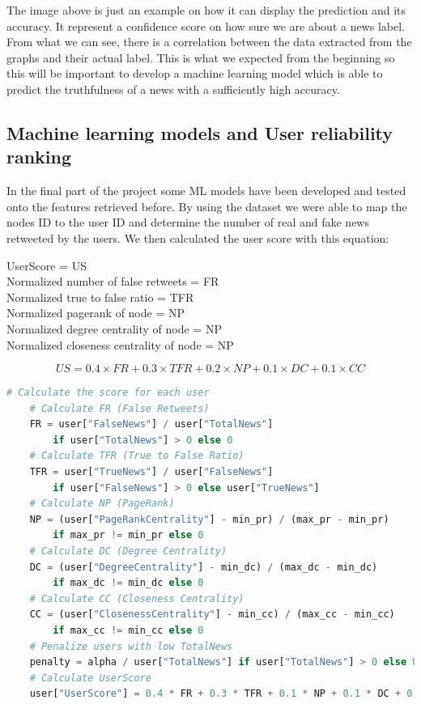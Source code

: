 \documentclass[11pt,a4paper]{article}
\begin{document}
The image above is just an example on how it can display the prediction and its accuracy. It represent
a conﬁdence score on how sure we are about a news label. From what we can see, there is a correlation between the data extracted from
the graphs and their actual label. This is what we expected from the beginning so this will be important to develop a machine learning model which is able to predict the truthfulness of a news with a sufficiently high accuracy.

\newpage

\subsection*{Machine learning models and User reliability ranking}

In the final part of the project some ML models have been developed and tested onto the features retrieved before. By using the dataset we were able to map the nodes ID to the user ID and determine the number of real and fake news retweeted by the users. We then calculated the user score with this equation:

\begin{center}
	UserScore = US \\
	Normalized number of false retweets = FR \\
	Normalized true to false ratio = TFR \\
	Normalized pagerank of node = NP \\
	Normalized degree centrality of node = NP \\
	Normalized closeness centrality of node = NP \\
\end{center}

\begin{equation}
	US = 0.4 \times FR + 0.3 \times TFR + 0.2 \times NP + 0.1 \times DC + 0.1 \times CC
\end{equation}

\begin{lstlisting}[language=Python]
	# Calculate the score for each user
    # Calculate FR (False Retweets)
    FR = user["FalseNews"] / user["TotalNews"] 
        if user["TotalNews"] > 0 else 0
    # Calculate TFR (True to False Ratio)
    TFR = user["TrueNews"] / user["FalseNews"] 
        if user["FalseNews"] > 0 else user["TrueNews"]
    # Calculate NP (PageRank)
    NP = (user["PageRankCentrality"] - min_pr) / (max_pr - min_pr) 
        if max_pr != min_pr else 0
    # Calculate DC (Degree Centrality)
    DC = (user["DegreeCentrality"] - min_dc) / (max_dc - min_dc) 
        if max_dc != min_dc else 0
    # Calculate CC (Closeness Centrality)
    CC = (user["ClosenessCentrality"] - min_cc) / (max_cc - min_cc) 
        if max_cc != min_cc else 0
    # Penalize users with low TotalNews
    penalty = alpha / user["TotalNews"] if user["TotalNews"] > 0 else 0
    # Calculate UserScore
    user["UserScore"] = 0.4 * FR + 0.3 * TFR + 0.1 * NP + 0.1 * DC + 0.1 * CC
\end{lstlisting}
\end{document}
